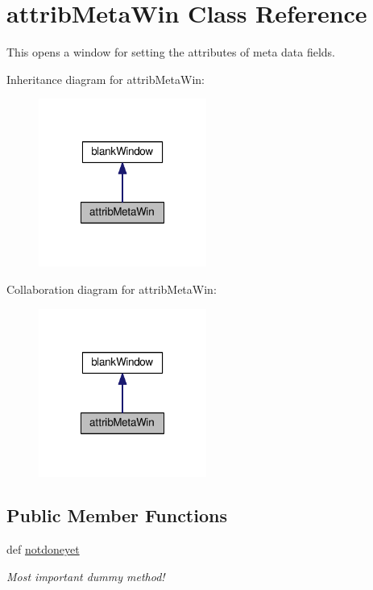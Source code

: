 \hypertarget{classgui_1_1window2_1_1attribMetaWin}{\section{attrib\-Meta\-Win Class Reference}
\label{classgui_1_1window2_1_1attribMetaWin}
}


This opens a window for setting the attributes of meta data fields.  




Inheritance diagram for attrib\-Meta\-Win\-:\nopagebreak
\begin{figure}[H]
\begin{center}
\leavevmode
\includegraphics[width=156pt]{classgui_1_1window2_1_1attribMetaWin__inherit__graph}
\end{center}
\end{figure}


Collaboration diagram for attrib\-Meta\-Win\-:\nopagebreak
\begin{figure}[H]
\begin{center}
\leavevmode
\includegraphics[width=156pt]{classgui_1_1window2_1_1attribMetaWin__coll__graph}
\end{center}
\end{figure}
\subsection*{Public Member Functions}
\begin{DoxyCompactItemize}
\item 
\hypertarget{classgui_1_1window2_1_1attribMetaWin_a615f3073891733337c33f599f89ec7ef}{def \hyperlink{classgui_1_1window2_1_1attribMetaWin_a615f3073891733337c33f599f89ec7ef}{notdoneyet}}\label{classgui_1_1window2_1_1attribMetaWin_a615f3073891733337c33f599f89ec7ef}

\begin{DoxyCompactList}\small\item\em Most important dummy method! \end{DoxyCompactList}\end{DoxyCompactItemize}


